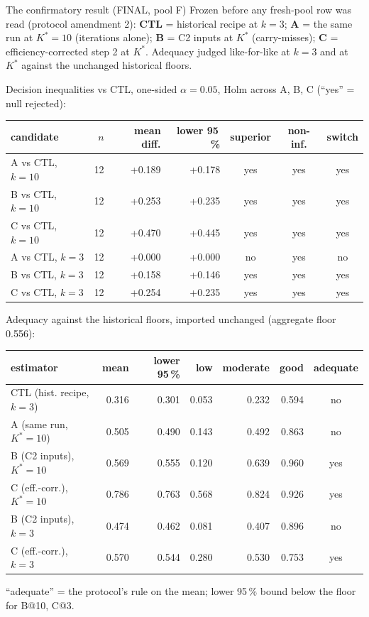 \documentclass[aspectratio=169,10pt]{beamer}
\def\evidencetext{}
\begin{document}
\gdef\evidencetext{\texttt{confirm/results/confirm\_results.json}}
\begin{frame}{The confirmatory result (FINAL, pool F)}
{\scriptsize Frozen before any fresh-pool row was read (protocol amendment 2): \textbf{CTL} = historical recipe at $k=3$; \textbf{A} = the same run at $K^*=10$ (iterations alone); \textbf{B} = C2 inputs at $K^*$ (carry-misses); \textbf{C} = efficiency-corrected step 2 at $K^*$. Adequacy judged like-for-like at $k=3$ and at $K^*$ against the unchanged historical floors.}\par\vspace{3pt}
{\small Decision inequalities vs CTL, one-sided $\alpha=0.05$, Holm across A, B, C (``yes'' = null rejected):}
\begin{center}
{\scriptsize
\begin{tabular}{lrrrccc}
\toprule
candidate & $n$ & mean diff. & lower 95\,\% & superior & non-inf. & switch \\
\midrule
A vs CTL, $k=10$ & 12 & +0.189 & +0.178 & yes & yes & yes \\
B vs CTL, $k=10$ & 12 & +0.253 & +0.235 & yes & yes & yes \\
C vs CTL, $k=10$ & 12 & +0.470 & +0.445 & yes & yes & yes \\
A vs CTL, $k=3$ & 12 & +0.000 & +0.000 & no & yes & no \\
B vs CTL, $k=3$ & 12 & +0.158 & +0.146 & yes & yes & yes \\
C vs CTL, $k=3$ & 12 & +0.254 & +0.235 & yes & yes & yes \\
\bottomrule
\end{tabular}}
\end{center}
{\small Adequacy against the historical floors, imported unchanged (aggregate floor 0.556):}
\begin{center}
{\scriptsize
\begin{tabular}{lrrrrrc}
\toprule
estimator & mean & lower 95\,\% & low & moderate & good & adequate \\
\midrule
CTL (hist. recipe, $k=3$) & 0.316 & 0.301 & 0.053 & 0.232 & 0.594 & no \\
A (same run, $K^*=10$) & 0.505 & 0.490 & 0.143 & 0.492 & 0.863 & no \\
B (C2 inputs), $K^*=10$ & 0.569 & 0.555 & 0.120 & 0.639 & 0.960 & yes \\
C (eff.-corr.), $K^*=10$ & 0.786 & 0.763 & 0.568 & 0.824 & 0.926 & yes \\
B (C2 inputs), $k=3$ & 0.474 & 0.462 & 0.081 & 0.407 & 0.896 & no \\
C (eff.-corr.), $k=3$ & 0.570 & 0.544 & 0.280 & 0.530 & 0.753 & yes \\
\bottomrule
\end{tabular}}
\end{center}\vspace{-8pt}\par{\tiny ``adequate'' = the protocol's rule on the mean; lower 95\,\% bound below the floor for B@10, C@3.}
\end{frame}
\end{document}
